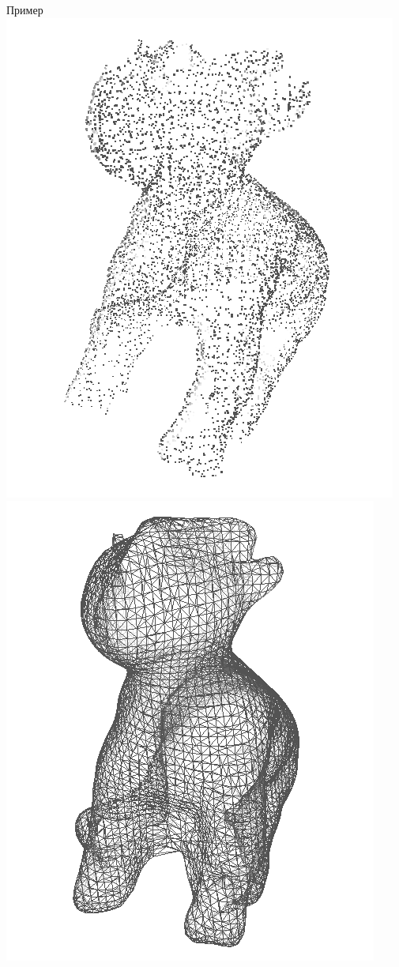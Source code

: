 \documentclass{beamer}
\begin{document}
\begin{frame}{Пример}
    \includegraphics[scale=0.45]{snapshot02a}
    \includegraphics[scale=0.45]{snapshot04a}
\end{frame}
\end{document}
